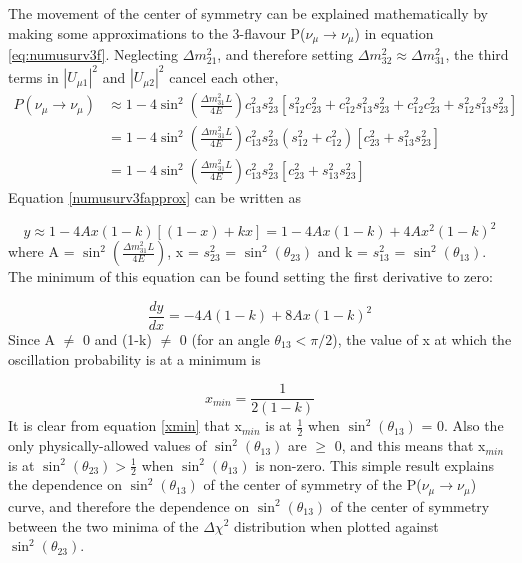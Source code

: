 The movement of the center of symmetry can be explained mathematically by making some approximations to the 3-flavour P($\nu_{\mu}\rightarrow\nu_{\mu}$) in equation \ref{eq:numusurv3f}. 
Neglecting $\Delta m_{21}^{2}$, and therefore setting $\Delta m_{32}^{2} \approx \Delta m_{31}^{2}$, the third terms in $|U_{\mu 1}|^{2}$ and $|U_{\mu 2}|^{2}$ cancel each other,
\begin{equation}
\begin{split}
P(\nu_{\mu}\rightarrow\nu_{\mu}) &\approx 1 - 4 \sin^{2}\left(\frac{\Delta m_{31}^{2} L}{4E}\right) c_{13}^{2}s_{23}^{2} \left[ s_{12}^{2}c_{23}^{2}+c_{12}^{2}s_{13}^{2}s_{23}^{2}+c_{12}^{2}c_{23}^{2}+s_{12}^{2}s_{13}^{2}s_{23}^{2}\right] \\
&= 1 - 4 \sin^{2}\left(\frac{\Delta m_{31}^{2} L}{4E}\right) c_{13}^{2}s_{23}^{2} \left(s_{12}^{2} + c_{12}^{2} \right) \left[ c_{23}^{2} + s_{13}^{2}s_{23}^{2} \right] \\
&= 1 - 4 \sin^{2}\left(\frac{\Delta m_{31}^{2} L}{4E}\right) c_{13}^{2}s_{23}^{2} \left[ c_{23}^{2} + s_{13}^{2}s_{23}^{2}\right]
\end{split}
\label{numusurv3fapprox}
\end{equation}
Equation \ref{numusurv3fapprox} can be written as

\begin{equation}
y \approx 1-4Ax(1-k)\left[(1-x)+kx\right] = 1-4Ax(1-k) +4Ax^{2}(1-k)^{2}
\end{equation}
where A = $\sin^{2}\left(\frac{\Delta m_{31}^{2} L}{4E}\right)$, x = $s_{23}^{2}$ = $\sin^{2}(\theta_{23})$ and k = $s_{13}^{2}$ = $\sin^{2}(\theta_{13})$. 
The minimum of this equation can be found setting the first derivative to zero:

\begin{equation}
\frac{dy}{dx} = -4A(1-k) +8Ax(1-k)^{2}
\end{equation}
Since A $\neq$ 0 and (1-k) $\neq$ 0 (for an angle $\theta_{13}<\pi/2$), the value of x at which the oscillation probability is at a minimum is

\begin{equation}
x_{min} = \frac{1}{2(1-k)}
\label{xmin}
\end{equation}
It is clear from equation \ref{xmin} that x$_{min}$ is at $\frac{1}{2}$ when $\sin^{2}(\theta_{13})$ = 0. Also the only physically-allowed values of 
$\sin^{2}(\theta_{13})$ are $\geq$ 0, and this means that x$_{min}$ is at $\sin^{2}(\theta_{23}) > \frac{1}{2}$ when $\sin^{2}(\theta_{13})$ is non-zero. 
This simple result explains the dependence on $\sin^{2}(\theta_{13})$ of the center of symmetry of the P($\nu_{\mu}\rightarrow\nu_{\mu}$) curve,
and therefore the dependence on $\sin^{2}(\theta_{13})$ of the center of symmetry between the two minima of the $\Delta \chi^{2}$ 
distribution when plotted against $\sin^{2}(\theta_{23})$. 

